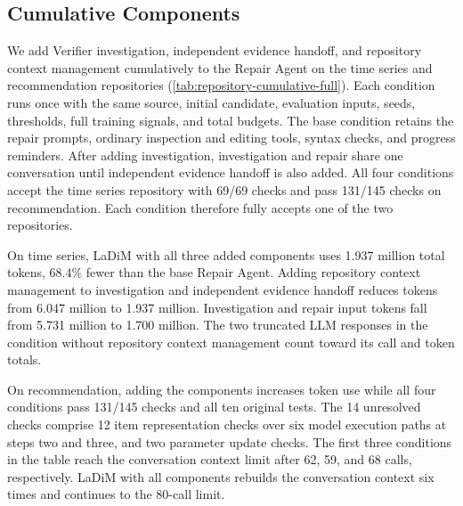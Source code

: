 \subsection{Cumulative Components}
We add Verifier investigation, independent evidence handoff, and repository context management cumulatively to the Repair Agent on the time series and recommendation repositories (\cref{tab:repository-cumulative-full}). Each condition runs once with the same source, initial candidate, evaluation inputs, seeds, thresholds, full training signals, and total budgets. The base condition retains the repair prompts, ordinary inspection and editing tools, syntax checks, and progress reminders. After adding investigation, investigation and repair share one conversation until independent evidence handoff is also added. All four conditions accept the time series repository with 69/69 checks and pass 131/145 checks on recommendation. Each condition therefore fully accepts one of the two repositories.
\begin{table}[!htb]
\caption{Cumulative agent components on both repositories. Checks reports passed behavior checks. Calls cover investigation and repair, and tokens also include the shared initial translation. Each row adds a component to the preceding row. Tokens are in millions.}
\label{tab:repository-cumulative-full}
\centering
\small
\setlength{\tabcolsep}{3pt}

\end{table}
On time series, LaDiM with all three added components uses 1.937 million total tokens, 68.4\% fewer than the base Repair Agent. Adding repository context management to investigation and independent evidence handoff reduces tokens from 6.047 million to 1.937 million. Investigation and repair input tokens fall from 5.731 million to 1.700 million. The two truncated LLM responses in the condition without repository context management count toward its call and token totals.

On recommendation, adding the components increases token use while all four conditions pass 131/145 checks and all ten original tests. The 14 unresolved checks comprise 12 item representation checks over six model execution paths at steps two and three, and two parameter update checks. The first three conditions in the table reach the conversation context limit after 62, 59, and 68 calls, respectively. LaDiM with all components rebuilds the conversation context six times and continues to the 80-call limit.

